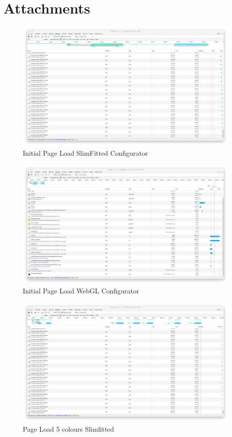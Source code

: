 \chapter{Attachments}


\begin{figure}
\includegraphics[width=15cm]{images/initialLoad}
\caption{Initial Page Load SlimFitted Configurator}
\label{attachment:initialLoadSlimFitted}
\end{figure}

\begin{figure}
\includegraphics[width=15cm]{images/initialLoadWebgl}
\caption{Initial Page Load WebGL Configurator}
\label{attachment:initialLoadWebGL}
\end{figure}

\clearpage

\begin{figure}
\includegraphics[width=15cm]{images/5differentColours}
\caption{Page Load 5 colours Slimfitted}
\label{attachment:fiveColoursSlimFitted}
\end{figure}

